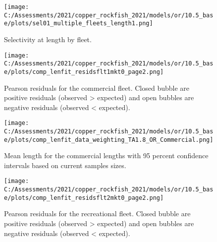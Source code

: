 \documentclass[11pt,
  english,
  a4paper,
]{article}
\begin{document}
\tagmcend\tagstructend


\begin{figure}
\centering
\texttt{[image: C:/Assessments/2021/copper\_rockfish\_2021/models/or/10.5\_base/plots/sel01\_multiple\_fleets\_length1.png]}
\caption{Selectivity at length by fleet.\label{fig:selex}}
\end{figure}

\tagmcend\tagstructend

\clearpage


\begin{figure}
\centering
\texttt{[image: C:/Assessments/2021/copper\_rockfish\_2021/models/or/10.5\_base/plots/comp\_lenfit\_residsflt1mkt0\_page2.png]}
\caption{Pearson residuals for the commercial fleet. Closed bubble are positive residuals (observed \textgreater{} expected) and open bubbles are negative residuals (observed \textless{} expected).\label{fig:com-pearson}}
\end{figure}

\tagmcend\tagstructend


\begin{figure}
\centering
\texttt{[image: C:/Assessments/2021/copper\_rockfish\_2021/models/or/10.5\_base/plots/comp\_lenfit\_data\_weighting\_TA1.8\_OR\_Commercial.png]}
\caption{Mean length for the commercial lengths with 95 percent confidence intervals based on current samples sizes.\label{fig:com-mean-len-fit}}
\end{figure}

\tagmcend\tagstructend


\begin{figure}
\centering
\texttt{[image: C:/Assessments/2021/copper\_rockfish\_2021/models/or/10.5\_base/plots/comp\_lenfit\_residsflt2mkt0\_page2.png]}
\caption{Pearson residuals for the recreational fleet. Closed bubble are positive residuals (observed \textgreater{} expected) and open bubbles are negative residuals (observed \textless{} expected).\label{fig:rec-pearson}}
\end{figure}
\end{document}
